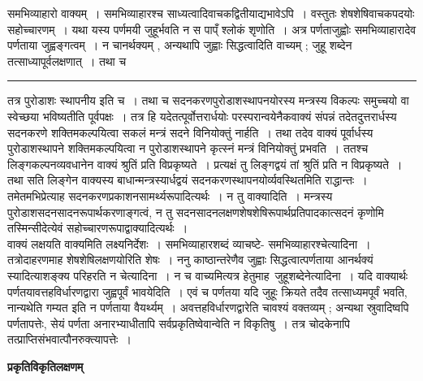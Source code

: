 \documentclass[11pt, openany]{book}
\begin{document}
{\bl समभिव्याहारो वाक्यम्~। समभिव्याहारश्च साध्यत्वादिवाचकद्वितीयाद्यभावेऽपि~। वस्तुतः शेषशेषिवाचकपदयोः सहोच्चारणम्~। यथा {\qtl यस्य पर्णमयी जुहूर्भवति न स पाप्ँ श्लोकं शृणोति}~। अत्र पर्णताजुह्वोः समभिव्याहारादेव पर्णताया जुह्वङ्गत्वम्~। न चानर्थक्यम् , अन्यथापि जुह्वाः सिद्धत्वादिति वाच्यम् ; {\qtl जुहू} शब्देन तत्साध्यापूर्वलक्षणात्~। तथा च }\\
\hrule
\vspace{3mm}
\noindent
तत्र पुरोडाशः स्थापनीय इति च~। तथा च सदनकरणपुरोडाशस्थापनयोरस्य मन्त्रस्य विकल्पः समुच्चयो वा स्वेच्छया भविष्यतीति पूर्वपक्षः~। तत्र हि \textendash यदेतत्पूर्वोत्तरार्धयोः परस्परान्वयेनैकवाक्यं संपन्नं तदेतदुत्तरार्धस्य सदनकरणे शक्तिमकल्पयित्वा सकलं मन्त्रं सदने विनियोक्तुं नार्हति~। तथा तदेव वाक्यं पूर्वार्धस्य पुरोडाशस्थापने शक्तिमकल्पयित्वा न पुरोडाशस्थापने कृत्स्नं मन्त्रं विनियोक्तुं प्रभवति~। ततश्च लिङ्गकल्पनव्यवधानेन वाक्यं श्रुतिं प्रति विप्रकृष्यते~। प्रत्यक्षं तु
लिङ्गद्वयं तां श्रुतिं प्रति न विप्रकृष्यते~। तथा सति लिङ्गेन वाक्यस्य बाधान्मन्त्रस्यार्धद्वयं सदनकरणस्थापनयोर्व्यवस्थितमिति राद्धान्तः~। तमेतमभिप्रेत्याह सदनकरणप्रकाशनसामर्थ्यरूपादित्यर्थः~। {\br न तु वाक्यादिति~।} मन्त्रस्य पुरोडाशसदनसादनरूपार्थकरणाङ्गत्वं, न तु
सदनसादनलक्षणशेषशेषिरूपार्थप्रतिपादकात्सदनं कृणोमि तस्मिन्सीदेत्येवं सहोच्चारणरूपाद्वाक्यादित्यर्थः~।\\


 वाक्यं लक्षयति वाक्यमिति लक्ष्यनिर्देशः~। {\qt समभिव्याहार}शब्दं व्याचष्टे- {\br समभिव्याहारश्चेत्यादिना~।} तत्रोदाहरणमाह  शेषशेषिलक्षणयोरिति शेषः~। {\br ननु} काष्ठान्तरेणैव जुह्वाः सिद्धत्वात्पर्णताया आनर्थक्यं स्यादित्याशङ्क्य परिहरति {\br न चेत्यादिना~।} न च वाच्यमित्यत्र हेतुमाह\textendash\ {\br जुहूशब्देनेत्यादिना~।} यदि
\newpage
\fancyhead[LO]{[प्रकृतिविकृतिलक्षणम् [}
{\bl\noindent वाक्यार्थः पर्णतयावत्तहविर्धारणद्वारा जुह्वपूर्वं भावयेदिति~। एवं च पर्णतया यदि जुहूः क्रियते तदैव तत्साध्यमपूर्वं भवति, नान्यथेति गम्यत इति न पर्णताया वैयर्थ्यम्~। अवत्तहविर्धारणद्वारेति चावश्यं वक्तव्यम् ; अन्यथा स्रुवादिष्वपि पर्णतापत्तेः, सेयं पर्णता अनारभ्याधीतापि सर्वप्रकृतिष्वेवान्वेति न विकृतिषु~। तत्र चोदकेनापि
तत्प्राप्तिसंभवात्पौनरुक्त्यापत्तेः~।}
\begin{center}
 \textbf{\textbf{प्रकृतिविकृतिलक्षणम् }}   
\end{center}
 
\end{document}
